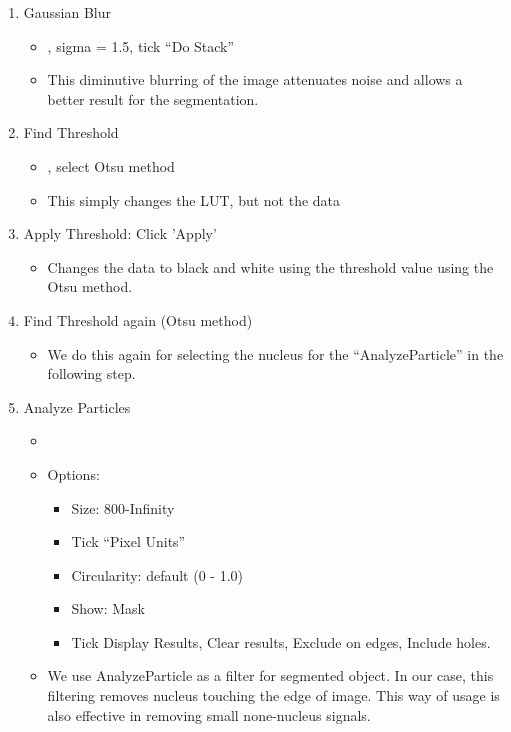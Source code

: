 \begin{enumerate}
  \item Gaussian Blur
  \begin{itemize}
    \item {}, sigma = 1.5, tick ``Do Stack''
    \item This diminutive blurring of the image attenuates noise and allows a better result for the segmentation.  
  \end{itemize}
  \item Find Threshold
  \begin{itemize}
    \item {},  select Otsu method
    \item This simply changes the LUT, but not the data 
  \end{itemize}
  \item Apply Threshold: Click 'Apply'
  \begin{itemize}
    \item Changes the data to black and white using the threshold value using the Otsu method. 
  \end{itemize}
  \item Find Threshold again (Otsu method)
  \begin{itemize}
    \item We do this again for selecting the nucleus for the ``AnalyzeParticle'' in the following step.
  \end{itemize}
  \item Analyze Particles
  \begin{itemize}
    \item {}
    \item Options:
    \begin{itemize}
      \item Size: 800-Infinity
      \item Tick ``Pixel Units''
      \item Circularity: default (0 - 1.0)
      \item Show: Mask
      \item Tick Display Results, Clear results, Exclude on edges, Include holes. 
    \end{itemize}
    \item We use AnalyzeParticle as a filter for segmented object. In our case, this filtering removes nucleus touching the edge of image. This way of usage is also effective in removing small none-nucleus signals. 

\end{itemize}
\end{enumerate}
